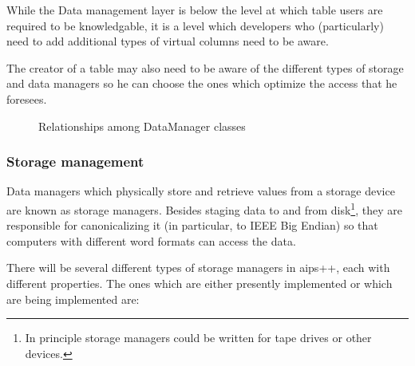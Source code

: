While the Data management layer is below the level at which table
users are required to be knowledgable, it is a level which developers
who (particularly) need to add additional types of virtual columns
need to be aware.

The creator of a table may also need to be aware of the different
types of storage and data managers so he can choose the ones which
optimize the access that he foresees.

\begin{figure}
\epsfverbosetrue
\epsfysize=7.0in
\caption{Relationships among DataManager classes}
\label{fig:DbDataMan}
\end{figure}

\subsubsection{Storage management}
\label{sec:StorageManagement}

Data managers which physically store and retrieve values from a
storage device are known as storage managers. Besides staging data to
and from disk\footnote{In principle storage managers could be written
for tape drives or other devices.}, they are responsible for
canonicalizing it (in particular, to IEEE Big Endian) so that
computers with different word formats can access the data.

There will be several different types of storage managers in {\sc
aips++}, each with different properties. The ones which are either
presently implemented or which are being implemented are:

